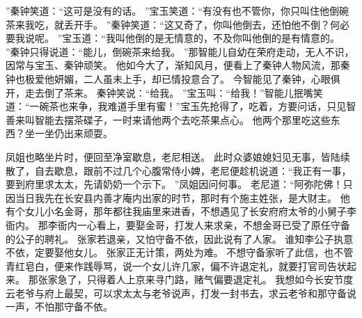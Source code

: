 ”秦钟笑道：“这可是没有的话。
”宝玉笑道：“有没有也不管你，你只叫住他倒碗茶来我吃，就丢开手。
”秦钟笑道：“这又奇了，你叫他倒去，还怕他不倒？何必要我说呢。
”宝玉道：“我叫他倒的是无情意的，不及你叫他倒的是有情意的。
”秦钟只得说道：“能儿，倒碗茶来给我。
”那智能儿自幼在荣府走动，无人不识，因常与宝玉、秦钟顽笑。
他如今大了，渐知风月，便看上了秦钟人物风流，那秦钟也极爱他妍媚，二人虽未上手，却已情投意合了。
今智能见了秦钟，心眼俱开，走去倒了茶来。
秦钟笑说：“给我。
”宝玉叫：“给我！”智能儿抿嘴笑道：“一碗茶也来争，我难道手里有蜜！”宝玉先抢得了，吃着，方要问话，只见智善来叫智能去摆茶碟子，一时来请他两个去吃茶果点心。
他两个那里吃这些东西？坐一坐仍出来顽耍。
\par
凤姐也略坐片时，便回至净室歇息，老尼相送。
此时众婆娘媳妇见无事，皆陆续散了，自去歇息，跟前不过几个心腹常侍小婢，老尼便趁机说道：“我正有一事，要到府里求太太，先请奶奶一个示下。
”凤姐因问何事。
老尼道：“阿弥陀佛！只因当日我先在长安县内善才庵内出家的时节，那时有个施主姓张，是大财主。
他有个女儿小名金哥，那年都往我庙里来进香，不想遇见了长安府府太爷的小舅子李衙内。
那李衙内一心看上，要娶金哥，打发人来求亲，不想金哥已受了原任守备的公子的聘礼。
张家若退亲，又怕守备不依，因此说有了人家。
谁知李公子执意不依，定要娶他女儿。
张家正无计策，两处为难。
不想守备家听了此信，也不管青红皂白，便来作践辱骂，说一个女儿许几家，偏不许退定礼，就要打官司告状起来。
那张家急了，只得着人上京来寻门路，赌气偏要退定礼。
我想如今长安节度云老爷与府上最契，可以求太太与老爷说声，打发一封书去，求云老爷和那守备说一声，不怕那守备不依。
